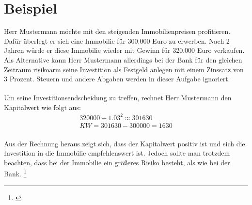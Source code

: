 \section{Beispiel}
Herr Mustermann möchte mit den steigenden Immobilienpreisen profitieren. Dafür überlegt er sich eine Immobilie für 300.000 Euro zu erwerben. Nach 2 Jahren würde er diese Immobilie wieder mit Gewinn für 320.000 Euro verkaufen. Als Alternative kann Herr Mustermann allerdings bei der Bank für den gleichen Zeitraum risikoarm seine Investition als Festgeld anlegen mit einem Zinssatz von 3 Prozent.
Steuern und andere Abgaben werden in dieser Aufgabe ignoriert.\\ \\
Um seine Investitionsendscheidung zu treffen, rechnet Herr Mustermann den Kapitalwert wie folgt aus:\\

\begin{align*}
    320000 \div 1.03^2 \approx 301630 \\
    KW = 301630 - 300000 = 1630
\end{align*}
\\
Aus der Rechnung heraus zeigt sich, dass der Kapitalwert positiv ist und sich die Investition in die Immobilie empfehlenswert ist. Jedoch sollte man trotzdem beachten, dass bei der Immobilie ein größeres Risiko besteht, als wie bei der Bank.
\footnote{\cite{welt-der-bwl-kapitalwertmethode}}
